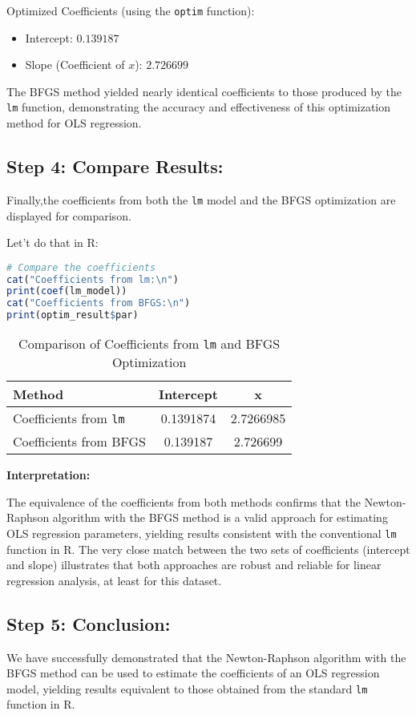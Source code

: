 \documentclass[12pt,letterpaper]{article}
\begin{document}
Optimized Coefficients (using the \texttt{optim} function):
\begin{itemize}
    \item Intercept: \( 0.139187 \)
    \item Slope (Coefficient of \( x \)): \( 2.726699 \)
\end{itemize}
The BFGS method yielded nearly identical coefficients to those produced by the \texttt{lm} function, demonstrating the accuracy and effectiveness of this optimization method for OLS regression.


\subsection*{Step 4: Compare Results:}

Finally,the coefficients from both the \texttt{lm} model and the BFGS optimization are displayed for comparison.

Let't do that in R: 
\begin{lstlisting}[language=R]
# Compare the coefficients
cat("Coefficients from lm:\n")
print(coef(lm_model))
cat("Coefficients from BFGS:\n")
print(optim_result$par)
\end{lstlisting}
\begin{table}[ht]
\centering
\begin{tabular}{lcc}
\hline
\textbf{Method} & \textbf{Intercept} & \textbf{x} \\
\hline
Coefficients from \texttt{lm} & 0.1391874 & 2.7266985 \\
Coefficients from BFGS & 0.139187 & 2.726699 \\
\hline
\end{tabular}
\caption{Comparison of Coefficients from \texttt{lm} and BFGS Optimization}
\label{tab:coeff_comparison}
\end{table}
\textbf{Interpretation:}

The equivalence of the coefficients from both methods confirms that the Newton-Raphson algorithm with the BFGS method is a valid approach for estimating OLS regression parameters, yielding results consistent with the conventional \texttt{lm} function in R. The very close match between the two sets of coefficients (intercept and slope) illustrates that both approaches are robust and reliable for linear regression analysis, at least for this dataset.
\subsection*{Step 5: Conclusion:}
We have successfully demonstrated that the Newton-Raphson algorithm with the BFGS method can be used to estimate the coefficients of an OLS regression model, yielding results equivalent to those obtained from the standard \texttt{lm} function in R.
\end{document}

